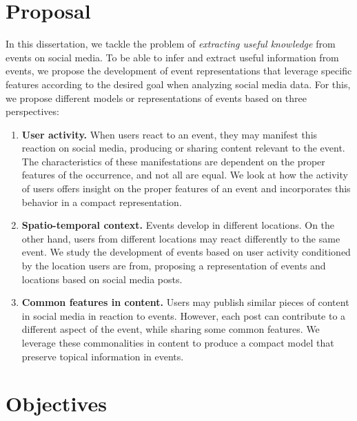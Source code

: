 

\section*{Proposal}

In this dissertation, we tackle the problem of {\em extracting useful knowledge}
from events on social media. 
%
To be able to infer and extract useful information from events, we propose the
development of event representations that leverage specific features according
to the desired goal when analyzing social media data.
%
For this, we propose different models or representations of events based on
three perspectives:
%

\begin{enumerate}
    \item {\bf User activity.} 
    When users react to an event, they may manifest this reaction on social
    media, producing or sharing content relevant to the event. 
    The characteristics of these manifestations are dependent on the proper
    features of the occurrence, and not all are equal. 
    We look at how the activity of users offers insight on the proper
    features of an event and incorporates this behavior in a compact
    representation.

    \item {\bf Spatio-temporal context.} 
    Events develop in different locations. 
    On the other hand, users from different locations may react differently to
    the same event.
    We study the development of events based on user activity conditioned by the
    location users are from, proposing a representation of events and locations
    based on social media posts.

    \item {\bf Common features in content.} 
    Users may publish similar pieces of content in social media in reaction to
    events.
    However, each post can contribute to a different aspect of the event, while
    sharing some common features.
    We leverage these commonalities in content to produce a compact model that
    preserve topical information in events.
    
\end{enumerate}


\section*{Objectives}

